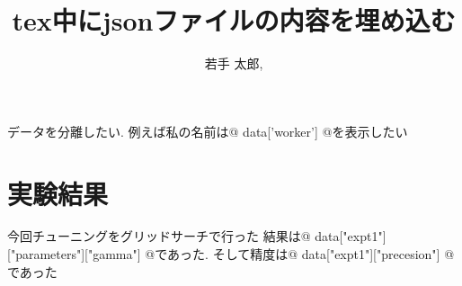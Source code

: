 \documentclass[twocolumn,uplatex]{jsarticle}
\begin{document}
\title{tex中にjsonファイルの内容を埋め込む} 
\author{
    若手 太郎,
}
\maketitle

データを分離したい.
例えば私の名前は{@ data['worker'] @}を表示したい

\section{実験結果}
今回チューニングをグリッドサーチで行った
結果は{@ data["expt1"]["parameters"]["gamma"] @}であった.
そして精度は{@ data["expt1"]["precesion"] @}であった
\end{document}

